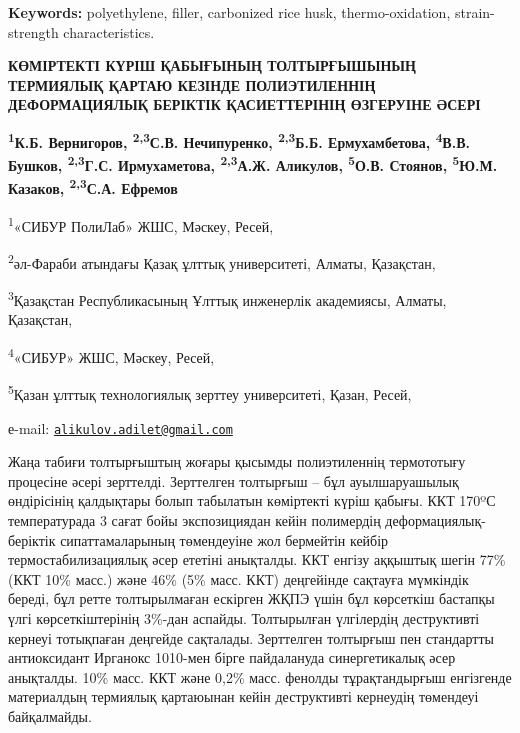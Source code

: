 {\bfseries Keywords:} polyethylene, filler, carbonized rice husk,
thermo-oxidation, strain-strength characteristics.

\begin{articleheader}
{\bfseries КӨМІРТЕКТІ КҮРІШ ҚАБЫҒЫНЫҢ ТОЛТЫРҒЫШЫНЫҢ ТЕРМИЯЛЫҚ ҚАРТАЮ
КЕЗІНДЕ ПОЛИЭТИЛЕННІҢ ДЕФОРМАЦИЯЛЫҚ БЕРІКТІК ҚАСИЕТТЕРІНІҢ ӨЗГЕРУІНЕ
ӘСЕРІ}

{\bfseries \textsuperscript{1}К.Б. Вернигоров, \textsuperscript{2,3}С.В.
Нечипуренко, \textsuperscript{2,3}Б.Б. Ермухамбетова,
\textsuperscript{4}В.В. Бушков, \textsuperscript{2,3}Г.С. Ирмухаметова,
\textsuperscript{2,3}А.Ж. Аликулов\textsuperscript{\envelope },
\textsuperscript{5}О.В. Стоянов, \textsuperscript{5}Ю.М. Казаков,
\textsuperscript{2,3}С.А. Ефремов}
\end{articleheader}

\begin{affiliation}
\textsuperscript{1}«СИБУР ПолиЛаб» ЖШС, Мәскеу, Ресей,

\textsuperscript{2}әл-Фараби атындағы Қазақ ұлттық университеті, Алматы,
Қазақстан,

\textsuperscript{3}Қазақстан Республикасының Ұлттық инженерлік
академиясы, Алматы, Қазақстан,

\textsuperscript{4}«СИБУР» ЖШС, Мәскеу, Ресей,

\textsuperscript{5}Қазан ұлттық технологиялық зерттеу университеті,
Қазан, Ресей,

е-mail: \href{mailto:alikulov.adilet@gmail.com}{\nolinkurl{alikulov.adilet@gmail.com}}
\end{affiliation}

Жаңа табиғи толтырғыштың жоғары қысымды полиэтиленнің термототығу
процесіне әсері зерттелді. Зерттелген толтырғыш -- бұл ауылшаруашылық
өндірісінің қалдықтары болып табылатын көміртекті күріш қабығы. ККТ
170ºС температурада 3 сағат бойы экспозициядан кейін полимердің
деформациялық-беріктік сипаттамаларының төмендеуіне жол бермейтін кейбір
термостабилизациялық әсер ететіні анықталды. ККТ енгізу аққыштық шегін
77\% (ККТ 10\% масс.) және 46\% (5\% масс. ККТ) деңгейінде сақтауға
мүмкіндік береді, бұл ретте толтырылмаған ескірген ЖҚПЭ үшін бұл
көрсеткіш бастапқы үлгі көрсеткіштерінің 3\%-дан аспайды. Толтырылған
үлгілердің деструктивті кернеуі тотықпаған деңгейде сақталады.
Зерттелген толтырғыш пен стандартты антиоксидант Ирганокс 1010-мен бірге
пайдалануда синергетикалық әсер анықталды. 10\% масс. ККТ және 0,2\%
масс. фенолды тұрақтандырғыш енгізгенде материалдың термиялық қартаюынан
кейін деструктивті кернеудің төмендеуі байқалмайды.

